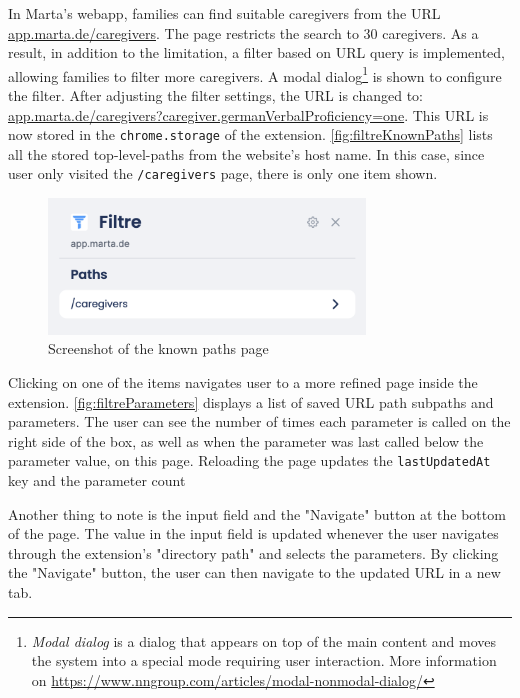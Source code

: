 In Marta's webapp, families can find suitable caregivers from the URL \url{app.marta.de/caregivers}. The page restricts the search to 30 caregivers. As a result, in addition to the limitation, a filter based on URL query is implemented, allowing families to filter more caregivers. A modal dialog\footnote{\emph{Modal dialog} is a dialog that appears on top of the main content and moves the system into a special mode requiring user interaction. More information on \url{https://www.nngroup.com/articles/modal-nonmodal-dialog/}} is shown to configure the filter. After adjusting the filter settings, the URL is changed to: \url{app.marta.de/caregivers?caregiver.germanVerbalProficiency=one}. This URL is now stored in the \texttt{chrome.storage} of the extension. \autoref{fig:filtreKnownPaths} lists all the stored top-level-paths from the website's host name. In this case, since user only visited the \texttt{/caregivers} page, there is only one item shown.

\begin{figure}[ht!]
  \centering
  \includegraphics[width=0.75\textwidth]{assets/Filtre_known_paths.png}
  \caption{Screenshot of the known paths page}
  \label{fig:filtreKnownPaths}
\end{figure}

Clicking on one of the items navigates user to a more refined page inside the extension. \autoref{fig:filtreParameters} displays a list of saved URL path subpaths and parameters. The user can see the number of times each parameter is called on the right side of the box, as well as when the parameter was last called below the parameter value, on this page. Reloading the page updates the \texttt{lastUpdatedAt} key and the parameter count

Another thing to note is the input field and the "Navigate" button at the bottom of the page. The value in the input field is updated whenever the user navigates through the extension's "directory path" and selects the parameters. By clicking the "Navigate" button, the user can then navigate to the updated URL in a new tab.

